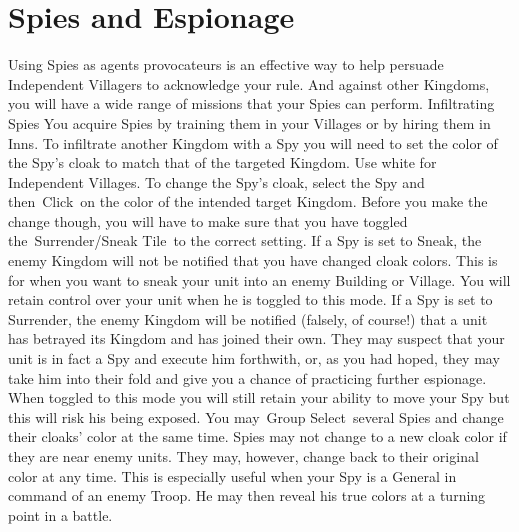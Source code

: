 
\chapter{Spies and Espionage}
Using Spies as agents provocateurs is an effective way to help persuade Independent Villagers to acknowledge your rule. And against other Kingdoms, you will have a wide range of missions that your Spies can perform.
Infiltrating Spies
You acquire Spies by training them in your Villages or by hiring them in Inns.
To infiltrate another Kingdom with a Spy you will need to set the color of the Spy’s cloak to match that of the targeted Kingdom. Use white for Independent Villages.
To change the Spy’s cloak, select the Spy and then Click on the color of the intended target Kingdom.
Before you make the change though, you will have to make sure that you have toggled the Surrender/Sneak Tile to the correct setting.
If a Spy is set to Sneak, the enemy Kingdom will not be notified that you have changed cloak colors. This is for when you want to sneak your unit into an enemy Building or Village. You will retain control over your unit when he is toggled to this mode.
If a Spy is set to Surrender, the enemy Kingdom will be notified (falsely, of course!) that a unit has betrayed its Kingdom and has joined their own. They may suspect that your unit is in fact a Spy and execute him forthwith, or, as you had hoped, they may take him into their fold and give you a chance of practicing further espionage. When toggled to this mode you will still retain your ability to move your Spy but this will risk his being exposed.
You may Group Select several Spies and change their cloaks’ color at the same time.
Spies may not change to a new cloak color if they are near enemy units. They may, however, change back to their original color at any time. This is especially useful when your Spy is a General in command of an enemy Troop. He may then reveal his true colors at a turning point in a battle.
